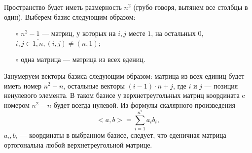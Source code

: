 \documentclass{article}
\begin{document}
Пространство будет иметь размерность $n^2$ (грубо говоря, вытянем все столбцы в один).
Выберем базис следующим образом:

\begin{itemize}
\item[$\circ$] $n^2-1$ --- матриц, у которых на $i,j$ месте $1$, на остальных $0$,\\
 $i,j \in \overline{1,n}, (i,j)\neq(n,1)$;
\item[$\circ$] одна матрица --- матрица из всех едениц.
\end{itemize}
Занумеруем векторы базиса следующим образом: матрица из всех единиц будет иметь
номер $n^2-n$, остальные векторы $(i-1)\cdot n+j$, где $i$ и $j$ --- позиция ненулевого
элемента.
В таком базисе у верхнетреугольных матриц координата c номером $n^2-n$ будет
всегда нулевой. Из формулы скалярного произведения $$<a,b>=\sum_{i=1}^{n^2}a_ib_i,$$
$a_i,b_i$ --- координаты в выбранном базисе, следует, что еденичная матрица
 ортогональна любой верхнетреугольной матрице.
\end{document}
